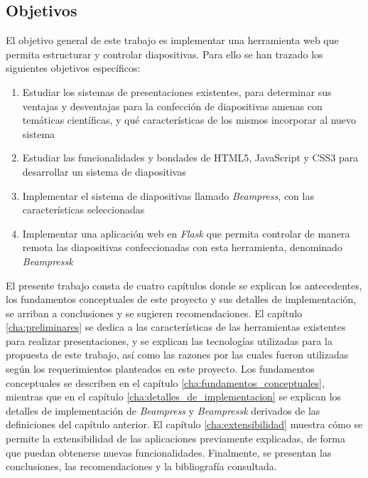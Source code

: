\begin{introduction}
	\section*{Objetivos} %
	\label{sec:objetivos}

		El objetivo general de este trabajo es implementar una herramienta web que permita estructurar y controlar diapositivas. Para ello se han trazado los siguientes objetivos específicos:

		\begin{enumerate}
			\item Estudiar los sistemas de presentaciones existentes, para determinar sus ventajas y desventajas para la confección de diapositivas amenas con temáticas científicas, y qué características de los mismos incorporar al nuevo sistema
			\item Estudiar las funcionalidades y bondades de HTML5, JavaScript y CSS3 para desarrollar un sistema de diapositivas
			\item Implementar el sistema de diapositivas llamado \textit{Beampress}, con las características seleccionadas
			\item Implementar una aplicación web en \textit{Flask} que permita controlar de manera remota las diapositivas confeccionadas con esta herramienta, denominado \textit{Beampressk}
		\end{enumerate}

		El presente trabajo consta de cuatro capítulos donde se explican los antecedentes, los fundamentos conceptuales de este proyecto y sus detalles de implementación, se arriban a conclusiones y se sugieren recomendaciones. El capítulo \ref{cha:preliminares} se dedica a las características de las herramientas existentes para realizar presentaciones, y se explican las tecnologías utilizadas para la propuesta de este trabajo, así como las razones por las cuales fueron utilizadas según los requerimientos planteados en este proyecto. Los fundamentos conceptuales se describen en el capítulo \ref{cha:fundamentos_conceptuales}, mientras que en el capítulo \ref{cha:detalles_de_implementacion} se explican los detalles de implementación de \textit{Beampress} y \textit{Beampressk} derivados de las definiciones del capítulo anterior. El capítulo \ref{cha:extensibilidad} muestra cómo se permite la extensibilidad de las aplicaciones previamente explicadas, de forma que puedan obtenerse nuevas funcionalidades. Finalmente, se presentan las conclusiones, las recomendaciones y la bibliografía consultada.





\end{introduction}




